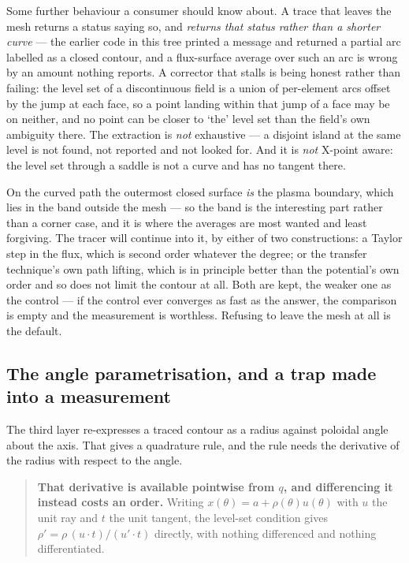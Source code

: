 Some further behaviour a consumer should know about. A trace that leaves the
mesh returns a status saying so, and \emph{returns that status rather than a
shorter curve} --- the earlier code in this tree printed a message and returned a
partial arc labelled as a closed contour, and a flux-surface average over such an
arc is wrong by an amount nothing reports. A corrector that stalls is being
honest rather than failing: the level set of a discontinuous field is a union of
per-element arcs offset by the jump at each face, so a point landing within that
jump of a face may be on neither, and no point can be closer to `the' level set
than the field's own ambiguity there. The extraction is \emph{not} exhaustive ---
a disjoint island at the same level is not found, not reported and not looked
for. And it is \emph{not} X-point aware: the level set through a saddle is not a
curve and has no tangent there.

On the curved path the outermost closed surface \emph{is} the plasma boundary,
which lies in the band outside the mesh --- so the band is the interesting part
rather than a corner case, and it is where the averages are most wanted and least
forgiving. The tracer will continue into it, by either of two constructions: a
Taylor step in the flux, which is second order whatever the degree; or the
transfer technique's own path lifting, which is in principle better than the
potential's own order and so does not limit the contour at all. Both are kept, the
weaker one as the control --- if the control ever converges as fast as the answer,
the comparison is empty and the measurement is worthless. Refusing to leave the
mesh at all is the default.

\subsection{The angle parametrisation, and a trap made into a measurement}
\label{sec:angleparam}

The third layer re-expresses a traced contour as a radius against poloidal angle
about the axis. That gives a quadrature rule, and the rule needs the derivative
of the radius with respect to the angle.

\begin{quote}
	\textbf{That derivative is available pointwise from $q$, and differencing it
	instead costs an order.} Writing $x(\theta) = a + \rho(\theta)u(\theta)$ with
	$u$ the unit ray and $t$ the unit tangent, the level-set condition gives
	$\rho' = \rho\,(u\cdot t)/(u'\cdot t)$ directly, with nothing differenced and
	nothing differentiated.
\end{quote}

